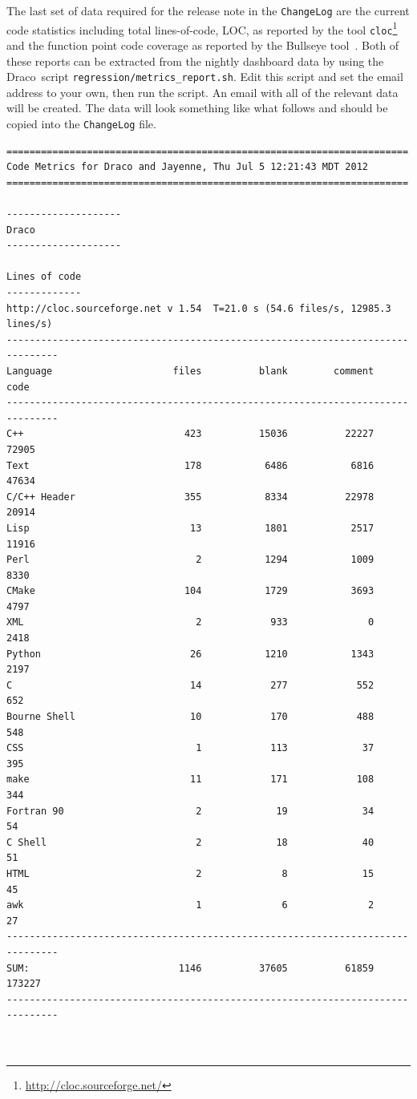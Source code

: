 \documentclass[note]{ResearchNote_pdf}
\newcommand{\draco}{{\normalfont\small\sffamily Draco}}
\begin{document}
The last set of data required for the release note in the
\texttt{ChangeLog} are the current code statistics including total
lines-of-code, LOC, as reported by the tool
\texttt{cloc}\footnote{\url{http://cloc.sourceforge.net/}} and the function point code coverage as
reported by the Bullseye tool~\cite{bullseyeweb}.  Both of these reports can be extracted from the nightly dashboard data by using the \draco\ script \texttt{regression/metrics\_report.sh}.  Edit this script and set the email address to your own, then run the script.  An email with all of the relevant data will be created.  The data will look something like what follows and should be copied into the \texttt{ChangeLog} file.
%
\begin{lstlisting}[basicstyle=\footnotesize, xleftmargin=0.5in, 
  xrightmargin=0.5in]
======================================================================
Code Metrics for Draco and Jayenne, Thu Jul 5 12:21:43 MDT 2012
======================================================================
 
--------------------
Draco
--------------------
 
Lines of code
-------------
http://cloc.sourceforge.net v 1.54  T=21.0 s (54.6 files/s, 12985.3 lines/s)
-------------------------------------------------------------------------------
Language                     files          blank        comment           code
-------------------------------------------------------------------------------
C++                            423          15036          22227          72905
Text                           178           6486           6816          47634
C/C++ Header                   355           8334          22978          20914
Lisp                            13           1801           2517          11916
Perl                             2           1294           1009           8330
CMake                          104           1729           3693           4797
XML                              2            933              0           2418
Python                          26           1210           1343           2197
C                               14            277            552            652
Bourne Shell                    10            170            488            548
CSS                              1            113             37            395
make                            11            171            108            344
Fortran 90                       2             19             34             54
C Shell                          2             18             40             51
HTML                             2              8             15             45
awk                              1              6              2             27
-------------------------------------------------------------------------------
SUM:                          1146          37605          61859         173227
-------------------------------------------------------------------------------



\end{lstlisting}
\end{document}
